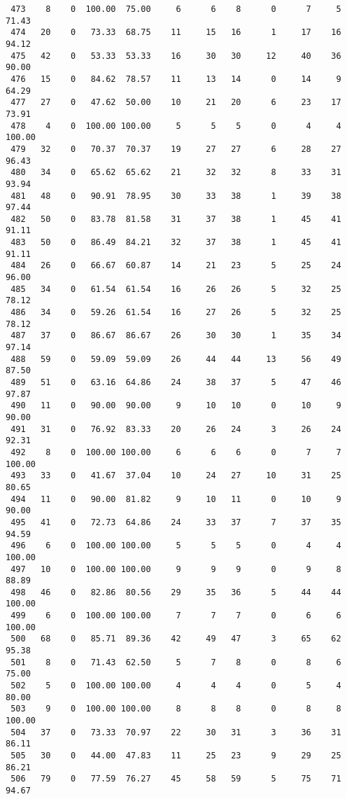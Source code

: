 \begin{verbatim}
 473    8    0  100.00  75.00     6      6    8      0      7     5    71.43
 474   20    0   73.33  68.75    11     15   16      1     17    16    94.12
 475   42    0   53.33  53.33    16     30   30     12     40    36    90.00
 476   15    0   84.62  78.57    11     13   14      0     14     9    64.29
 477   27    0   47.62  50.00    10     21   20      6     23    17    73.91
 478    4    0  100.00 100.00     5      5    5      0      4     4   100.00
 479   32    0   70.37  70.37    19     27   27      6     28    27    96.43
 480   34    0   65.62  65.62    21     32   32      8     33    31    93.94
 481   48    0   90.91  78.95    30     33   38      1     39    38    97.44
 482   50    0   83.78  81.58    31     37   38      1     45    41    91.11
 483   50    0   86.49  84.21    32     37   38      1     45    41    91.11
 484   26    0   66.67  60.87    14     21   23      5     25    24    96.00
 485   34    0   61.54  61.54    16     26   26      5     32    25    78.12
 486   34    0   59.26  61.54    16     27   26      5     32    25    78.12
 487   37    0   86.67  86.67    26     30   30      1     35    34    97.14
 488   59    0   59.09  59.09    26     44   44     13     56    49    87.50
 489   51    0   63.16  64.86    24     38   37      5     47    46    97.87
 490   11    0   90.00  90.00     9     10   10      0     10     9    90.00
 491   31    0   76.92  83.33    20     26   24      3     26    24    92.31
 492    8    0  100.00 100.00     6      6    6      0      7     7   100.00
 493   33    0   41.67  37.04    10     24   27     10     31    25    80.65
 494   11    0   90.00  81.82     9     10   11      0     10     9    90.00
 495   41    0   72.73  64.86    24     33   37      7     37    35    94.59
 496    6    0  100.00 100.00     5      5    5      0      4     4   100.00
 497   10    0  100.00 100.00     9      9    9      0      9     8    88.89
 498   46    0   82.86  80.56    29     35   36      5     44    44   100.00
 499    6    0  100.00 100.00     7      7    7      0      6     6   100.00
 500   68    0   85.71  89.36    42     49   47      3     65    62    95.38
 501    8    0   71.43  62.50     5      7    8      0      8     6    75.00
 502    5    0  100.00 100.00     4      4    4      0      5     4    80.00
 503    9    0  100.00 100.00     8      8    8      0      8     8   100.00
 504   37    0   73.33  70.97    22     30   31      3     36    31    86.11
 505   30    0   44.00  47.83    11     25   23      9     29    25    86.21
 506   79    0   77.59  76.27    45     58   59      5     75    71    94.67

\end{verbatim}
